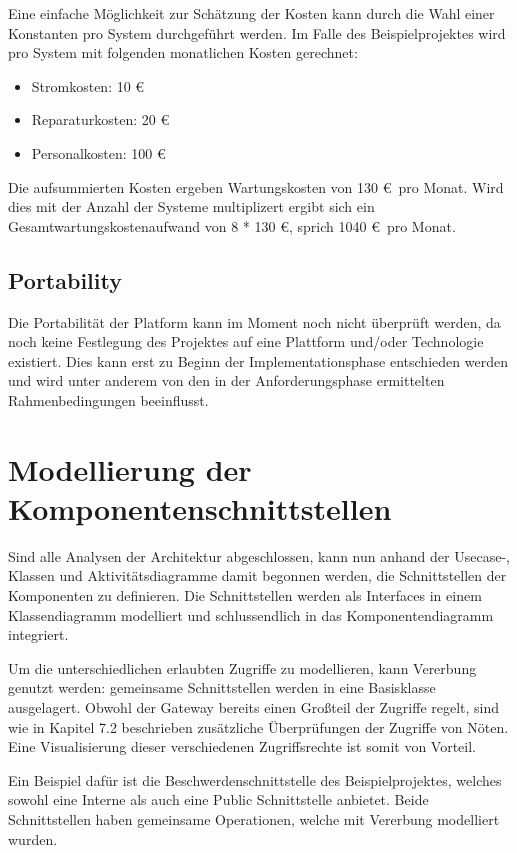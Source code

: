 Eine einfache Möglichkeit zur Schätzung der Kosten kann durch die Wahl einer Konstanten pro System durchgeführt werden. Im Falle des Beispielprojektes wird pro System mit folgenden monatlichen Kosten gerechnet:

\begin{itemize}
  \item Stromkosten: 10 \euro
  \item Reparaturkosten: 20 \euro
  \item Personalkosten: 100 \euro
\end{itemize}

Die aufsummierten Kosten ergeben Wartungskosten von 130 \euro \ pro Monat. Wird dies mit der Anzahl der Systeme multiplizert ergibt sich ein Gesamtwartungskostenaufwand von 8 * 130 \euro, sprich 1040 \euro \ pro Monat.

\subsection{Portability}
Die Portabilität der Platform kann im Moment noch nicht überprüft werden, da noch keine Festlegung des Projektes auf eine Plattform und/oder Technologie existiert. Dies kann erst zu Beginn der Implementationsphase entschieden werden und wird unter anderem von den in der Anforderungsphase ermittelten Rahmenbedingungen beeinflusst.


\section{Modellierung der Komponentenschnittstellen}
Sind alle Analysen der Architektur abgeschlossen, kann nun anhand der Usecase-, Klassen und Aktivitätsdiagramme damit begonnen werden, die Schnittstellen der Komponenten zu definieren. Die Schnittstellen werden als Interfaces in einem Klassendiagramm modelliert und schlussendlich in das Komponentendiagramm integriert.

Um die unterschiedlichen erlaubten Zugriffe zu modellieren, kann Vererbung genutzt werden: gemeinsame Schnittstellen werden in eine Basisklasse ausgelagert. Obwohl der Gateway bereits einen Großteil der Zugriffe regelt, sind wie in Kapitel 7.2 beschrieben zusätzliche Überprüfungen der Zugriffe von Nöten. Eine Visualisierung dieser verschiedenen Zugriffsrechte ist somit von Vorteil.

Ein Beispiel dafür ist die Beschwerdenschnittstelle des Beispielprojektes, welches sowohl eine Interne als auch eine Public Schnittstelle anbietet. Beide Schnittstellen haben gemeinsame Operationen, welche mit Vererbung modelliert wurden.

